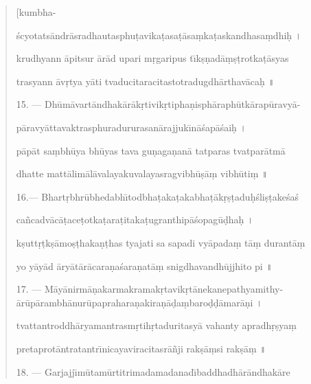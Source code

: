 \documentclass[a4paper, 11pt, oneside, french]{article}
\begin{document}
\begin{quotation}
\hspace*{85mm}[kumbha-

\'{s}cyotats\={a}ndr\={a}sradhautasphu\d{t}avika\d{t}asa\d{t}\={a}sa\d{m}ka\d{t}askandhasa\d{m}dhi\d{h} \texthindi{।}

krudhyann \={a}pitsur \={a}r\={a}d upari m\d{r}garipus t\={\i}k\d{s}\d{n}ad\={a}\d{m}\d{s}\d{t}rotka\d{t}\={a}syas

trasyann \={a}v\d{r}tya y\={a}ti tvaducitaracitastotradugdh\={a}rthav\={a}ca\d{h} \texthindi{॥}

\bigskip

15. --- Dh\={u}m\={a}vart\={a}ndhak\={a}r\={a}k\d{r}tivik\d{r}tipha\d{n}isph\={a}raph\={u}tk\={a}rap\={u}ravy\={a}-

p\={a}ravy\={a}ttavaktrasphuradururasan\={a}rajjuk\={\i}n\={a}\'{s}ap\={a}\'{s}ai\d{h} \texthindi{।}

p\={a}p\={a}t sa\d{m}bh\={u}ya bh\={u}yas tava gu\d{n}aga\d{n}an\={a} tatparas tvatpar\={a}tm\={a}

dhatte matt\={a}lim\={a}l\={a}valayakuvalayasragvibh\={u}\d{s}\={a}\d{m} vibh\={u}ti\d{m} \texthindi{॥}

\bigskip

16.--- Bhart\d{r}bhr\={u}bhedabh\={\i}todbha\d{t}aka\d{t}akabha\d{t}\={a}k\d{r}\d{s}\d{t}adu\d{h}\'{s}li\d{s}\d{t}ake\'{s}a\'{s}

ca\~{n}cadv\={a}c\={a}\d{t}ace\d{t}otka\d{t}ara\d{t}itaka\d{t}ugranthip\={a}\'{s}opag\={u}\d{d}ha\d{h} \texthindi{।}

k\d{s}utt\d{r}\d{t}k\d{s}\={a}mo\d{s}\d{t}haka\d{n}\d{t}has tyajati sa sapadi vy\={a}pada\d{m} t\={a}\d{m} durant\={a}\d{m}

yo y\={a}y\={a}d \={a}ry\={a}t\={a}r\={a}cara\d{n}a\'{s}ara\d{n}at\={a}\d{m} snigdhavandh\={u}jjhito pi \texthindi{॥}

\bigskip

17. --- M\={a}y\={a}nirm\={a}\d{n}akarmakramak\d{r}tavik\d{r}t\={a}nekanepathyamithy-
\={a}r\={u}p\={a}rambh\={a}nur\={u}paprahara\d{n}akira\d{n}\={a}\d{d}a\d{m}baro\d{d}\d{d}\={a}mar\={a}\d{n}i \texthindi{।}

tvattantroddh\={a}ryamantrasm\d{r}tih\d{r}taduritasy\={a} vahanty apradh\d{r}\d{s}ya\d{m}

pretaprot\={a}ntratantr\={\i}nicayaviracitasr\={a}\~{n}ji rak\d{s}\={a}\d{m}si rak\d{s}\={a}\d{m} \texthindi{॥}

\bigskip

18. --- Garjajj\={\i}m\={u}tam\={u}rtitrimadamadanad\={\i}baddhadh\={a}r\={a}ndhak\={a}re


\end{quotation}
\end{document}
